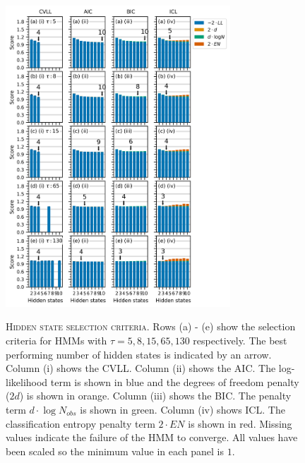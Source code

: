 \begin{figure}
    \centering
    \caption[Hidden state selection criteria]{\textsc{Hidden state selection criteria}. Rows (a) - (e) show the selection criteria for HMMs with $\tau=5, 8, 15, 65, 130$ respectively. The best performing number of hidden states is indicated by an arrow. Column (i) shows the CVLL. Column (ii) shows the AIC. The log-likelihood term is shown in blue and the degrees of freedom penalty ($2d$) is shown in orange. Column (iii) shows the BIC. The penalty term $d\cdot\log{N_{obs}}$ is shown in green.  Column (iv) shows ICL. The classification entropy penalty term $2\cdot EN$ is shown in red. Missing values indicate the failure of the HMM to converge. All values have been scaled so the minimum value in each panel is $1$.}
    \includegraphics[width=0.75\textwidth]{chapters/hmm_selection/figures/prinz_h_state_selection.png}
    \label{fig:prinz_criteria_results}
\end{figure}

